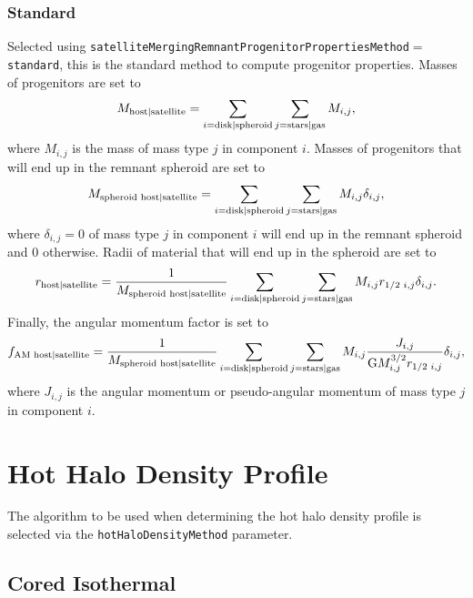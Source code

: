 \subsubsection{Standard}

Selected using {\tt satelliteMergingRemnantProgenitorPropertiesMethod}$=${\tt standard}, this is the standard method to compute progenitor properties. Masses of progenitors are set to
\begin{equation}
 M_{\rm host|satellite} = \sum_{i={\rm disk|spheroid}} \sum_{j={\rm stars|gas}} M_{i,j},
\end{equation}
where $M_{i,j}$ is the mass of mass type $j$ in component $i$. Masses of progenitors that will end up in the remnant spheroid are set to
\begin{equation}
 M_{\rm spheroid\,\,host|satellite} = \sum_{i={\rm disk|spheroid}} \sum_{j={\rm stars|gas}} M_{i,j} \delta_{i,j},
\end{equation}
where $\delta_{i,j}=0$ of mass type $j$ in component $i$ will end up in the remnant spheroid and $0$ otherwise. Radii of material that will end up in the spheroid are set to
\begin{equation}
 r_{\rm host|satellite} = {1 \over M_{\rm spheroid\,\,host|satellite}} \sum_{i={\rm disk|spheroid}} \sum_{j={\rm stars|gas}} M_{i,j} r_{1/2\,\,i,j} \delta_{i,j}.
\end{equation}
Finally, the angular momentum factor is set to
\begin{equation}
 f_{\rm AM\,\,host|satellite} = {1 \over M_{\rm spheroid\,\,host|satellite}} \sum_{i={\rm disk|spheroid}} \sum_{j={\rm stars|gas}} M_{i,j} {J_{i,j} \over {\rm G} M^{3/2}_{i,j} r_{1/2\,\,i,j}} \delta_{i,j},
\end{equation}
where $J_{i,j}$ is the angular momentum or pseudo-angular momentum of mass type $j$ in component $i$.

\section{Hot Halo Density Profile}

The algorithm to be used when determining the hot halo density profile is selected via the {\tt hotHaloDensityMethod} parameter.

\subsection{Cored Isothermal}

